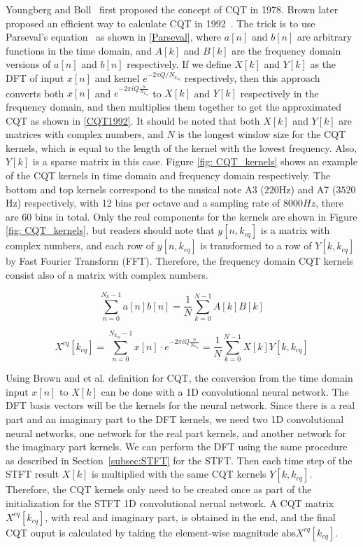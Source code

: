 \documentclass{ieeeaccess}
\begin{document}
Youngberg and Boll~\cite{youngberg1978constant} first proposed the concept of CQT in 1978. Brown later proposed an efficient way to calculate CQT in 1992~\cite{brown1992efficient}. The trick is to use Parseval's equation~\cite{Oppenheim1989DiscretetimeSP} as shown in \eqref{Parseval}, where $a[n]$ and $b[n]$ are arbitrary functions in the time domain, and $A[k]$ and $B[k]$ are the frequency domain versions of $a[n]$ and $b[n]$ respectively. If we define $X[k]$ and $Y[k]$ as the DFT of input $x[n]$ and kernel $e^{-2\pi Q/N_{k_{cq}}}$ respectively, then this approach converts both $x[n]$ and $e^{-2\pi iQ\frac{n}{N_{k_{cq}}}}$ to $X[k]$ and $Y[k]$ respectively in the frequency domain, and then multiplies them together to get the approximated CQT as shown in \eqref{CQT1992}. It should be noted that both $X[k]$ and $Y[k]$ are  matrices with complex numbers, and $N$ is the longest window size for the CQT kernels, which is equal to the length of the kernel with the lowest frequency. Also, $Y[k]$ is a sparse matrix in this case. Figure \ref{fig: CQT_kernels} shows an example of the CQT kernels in time domain and frequency domain respectively. The bottom and top kernels correspond to the musical note A3 ($220$Hz) and A7 ($3520$Hz) respectively, with 12 bins per octave and a sampling rate of $8000Hz$, there are 60 bins in total. Only the real components for the kernels are shown in Figure \ref{fig: CQT_kernels}, but readers should note that $y[n,k_{cq}]$ is a matrix with complex numbers, and each row of $y[n,k_{cq}]$ is transformed to a row of $Y[k,k_{cq}]$ by Fast Fourier Transform (FFT). Therefore, the frequency domain CQT kernels consist also of a matrix with complex numbers.

\begin{equation}
    \sum_{n=0}^{N_k-1}a[n]b[n] = \frac{1}{N}\sum_{k=0}^{N-1}A[k]B[k]
    \label{Parseval}
\end{equation}

\begin{equation}
    X^{cq}[k_{cq}]= \sum_{n=0}^{N_{k_{cq}}-1}x[n]\cdot e^{-2\pi i Q \frac{n}{N_{k_{cq}}}} = \frac{1}{N}\sum_{k=0}^{N-1}X[k]Y[k, k_{cq}]
    \label{CQT1992}
\end{equation}




Using Brown and et al. definition for CQT, the conversion from the time domain input $x[n]$ to $X[k]$ can be done with a 1D convolutional neural network. The DFT basis vectors will be the kernels for the neural network. Since there is a real part and an imaginary part to the DFT kernels, we need two 1D convolutional neural networks, one network for the real part kernels, and another network for the imaginary part kernels. We can perform the DFT using the same procedure as described in Section~\ref{subsec:STFT} for the STFT. Then each time step of the STFT result $X[k]$ is multiplied with the same CQT kernels $Y[k, k_{cq}]$. Therefore, the CQT kernels only need to be created once as part of the initialization for the STFT 1D convolutional nerual network. A CQT matrix $X^{cq}[k_{cq}]$, with real and imaginary part, is obtained in the end, and the final CQT ouput is calculated by taking the element-wise magnitude $\text{abs}{X^{cq}[k_{cq}]}$.
\end{document}
